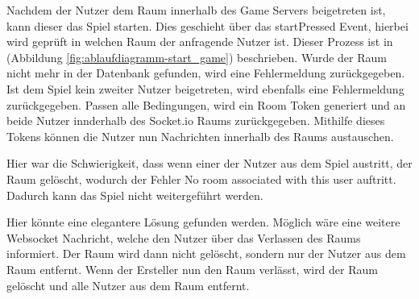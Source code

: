 \documentclass[
]{article}
\begin{document}
Nachdem der Nutzer dem Raum innerhalb des Game Servers beigetreten ist, kann dieser das Spiel starten.
Dies geschieht über das startPressed Event, hierbei wird geprüft in welchen Raum der anfragende Nutzer ist.
Dieser Prozess ist in (Abbildung \ref{fig:ablaufdiagramm-start_game}) beschrieben.
Wurde der Raum nicht mehr in der Datenbank gefunden, wird eine Fehlermeldung zurückgegeben.
Ist dem Spiel kein zweiter Nutzer beigetreten, wird ebenfalls eine Fehlermeldung zurückgegeben.
Passen alle Bedingungen, wird ein Room Token generiert und an beide Nutzer innderhalb des Socket.io Raums zurückgegeben.
Mithilfe dieses Tokens können die Nutzer nun Nachrichten innerhalb des Raums austauschen.

Hier war die Schwierigkeit, dass wenn einer der Nutzer aus dem Spiel austritt, der Raum gelöscht, wodurch der Fehler
\glqq No room associated with this user\grqq{} auftritt. Dadurch kann das Spiel nicht weitergeführt werden.

Hier könnte eine elegantere Lösung gefunden werden. Möglich wäre eine weitere Websocket Nachricht, welche den Nutzer 
über das Verlassen des Raums informiert. Der Raum wird dann nicht gelöscht, sondern nur der Nutzer aus dem Raum entfernt.
Wenn der Ersteller nun den Raum verlässt, wird der Raum gelöscht und alle Nutzer aus dem Raum entfernt.
\end{document}
